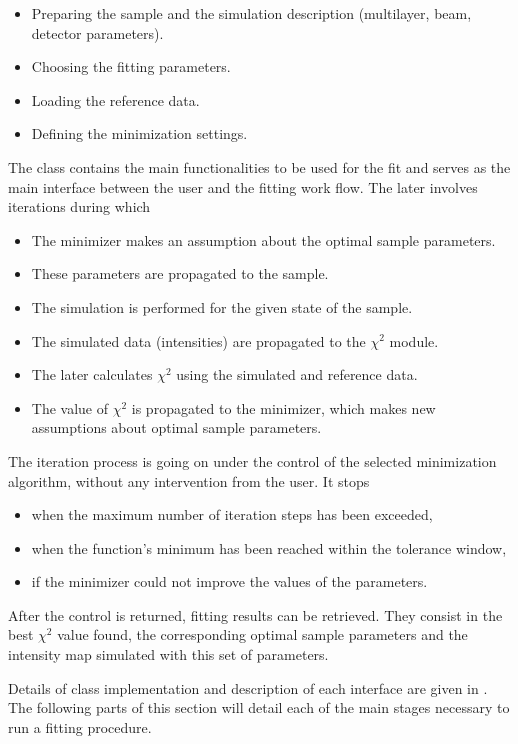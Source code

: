 \begin{itemize}
\item Preparing the sample and the simulation description (multilayer, beam, detector parameters).
\item Choosing the fitting parameters.
\item Loading the reference data.
\item Defining the minimization settings.
\end{itemize}

The class  contains the main functionalities to be used for the fit
and serves as the main interface between the user and the fitting work flow. 
The later involves iterations during which

\begin{itemize}
\item The minimizer makes an assumption about the optimal sample parameters.
\item These parameters are propagated to the sample.
\item The simulation is performed for the given state of the sample.
\item The simulated data (intensities) are propagated to the $\chi^2$ module.
\item The later calculates $\chi^2$ using the simulated and reference data.
\item The value of $\chi^2$ is propagated to the minimizer, which makes new assumptions about optimal sample parameters.
\end{itemize}

The iteration process is going on under the control of the selected minimization
algorithm, without any intervention from the
user. It stops 
\begin{itemize}
\item when the maximum number of iteration steps has been exceeded,
\item when the function's minimum has been reached within the tolerance window,
\item if the minimizer could not improve the values of the parameters. 
\end{itemize}

After the control is returned, fitting results can be retrieved.
They consist in the best $\chi^2$ value found, the corresponding
optimal sample parameters and the intensity map simulated with this set of parameters.

Details of  class implementation and description
of each interface are given in . The following parts of this section will detail each of
the main stages necessary to run a fitting procedure.


